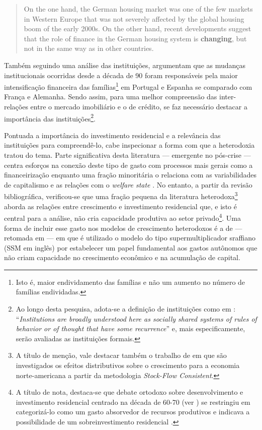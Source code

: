\begin{quote}
On the one hand, the German housing
market was one of the few markets in Western Europe that was not severely affected by the
global housing boom of the early 2000s. On the other hand, recent developments suggest
that the role of finance in the German housing system is \textbf{changing}, but not in the same way as
in other countries. \cite[p.~969, grifos adicionados]{wijburg_alternative_2017}
\end{quote}
Também seguindo uma análise das instituições, \textcite{van_gunten_varieties_2018} argumentam que as mudanças institucionais ocorridas desde a década de 90 foram responsáveis pela maior intensificação financeira das famílias\footnote{Isto é, maior endividamento das famílias e não um aumento no número de famílias endividadas.} em Portugal e Espanha se comparado com França e Alemanha. Sendo assim, para uma melhor compreensão das inter-relações entre o mercado imobiliário e o de crédito, se faz necessário destacar a importância das instituições\footnote{
	Ao longo desta pesquisa, adota-se a definição de instituições como em 	\textcite[p.~85]{dequech_economic_2013}: ``\textit{Institutions are broadly understood here as socially shared systems of rules of behavior or of thought that have some recurrence}'' e, mais especificamente, serão avaliadas as instituições formais.}.  


Pontuada a importância do investimento residencial e a relevância das instituições para compreendê-lo, cabe inspecionar a forma com que a heterodoxia tratou do tema. Parte significativa desta literatura  --- emergente no pós-crise --- centra esforços na conexão deste tipo de gasto com processos mais gerais como a financeirização \cites{aalbers_financialization_2008}{bibow_financialization_2010} enquanto uma fração minoritária o relaciona com as variabilidades de capitalismo e as relações com o \textit{welfare state} \cite{schwartz_politics_2009}. 
No entanto, a partir da revisão bibliográfica, verificou-se que uma fração pequena da literatura heterodoxa\footnote{
	A título de menção, vale destacar também o trabalho de \textcite{zezza_u.s._2008} em que são investigados os efeitos distributivos sobre o crescimento para a economia norte-americana a partir da metodologia \textit{Stock-Flow Consistent}.}
aborda as relações entre crescimento e investimento residencial que, e isto é central para a análise, não cria capacidade produtiva ao setor privado\footnote{A título de nota, destaca-se que debate ortodoxo sobre desenvolvimento e investimento residencial centrado na década de 60-70 (ver \textcite{arku_housing_2006}) se restringiu em categorizá-lo como um gasto absorvedor de recursos produtivos e indicava  a possibilidade de um sobreinvestimento residencial \cites{solow_importance_1995}{mills_has_1987}. }. 
Uma forma de incluir esse gasto nos modelos de crescimento heterodoxos é a de \textcite{teixeira_crescimento_2015} --- retomada em \textcite{da_silveira_investimento_2019} --- em que é utilizado o modelo do tipo supermultiplicador sraffiano (SSM em inglês) por estabelecer um papel fundamental aos gastos autônomos que não criam capacidade no crescimento econômico e na acumulação de capital.



